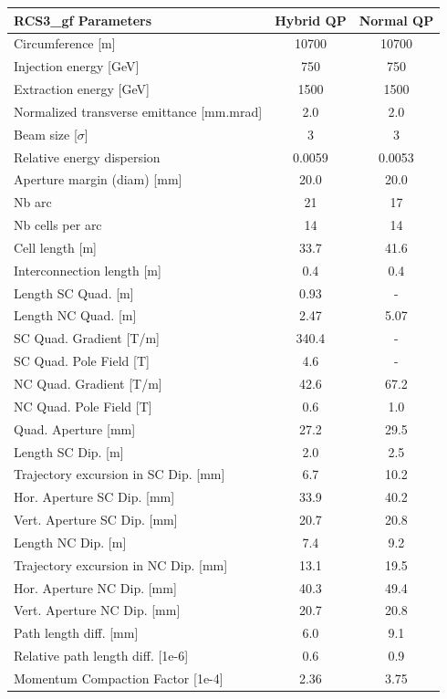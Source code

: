 \begin{tabular}{lcc}
\toprule
RCS3_gf Parameters & Hybrid QP & Normal QP \\
\midrule
Circumference [m] & 10700 & 10700 \\
Injection energy [GeV] & 750 & 750 \\
Extraction energy [GeV] & 1500 & 1500 \\
Normalized transverse emittance [mm.mrad] & 2.0 & 2.0 \\
Beam size [$\sigma$] & 3 & 3 \\
Relative energy dispersion & 0.0059 & 0.0053 \\
Aperture margin (diam) [mm] & 20.0 & 20.0 \\
Nb arc & 21 & 17 \\
Nb cells per arc & 14 & 14 \\
Cell length [m] & 33.7 & 41.6 \\
Interconnection length [m] & 0.4 & 0.4 \\
Length SC Quad. [m] & 0.93 & - \\
Length NC Quad. [m] & 2.47 & 5.07 \\
SC Quad. Gradient [T/m] & 340.4 & - \\
SC Quad. Pole Field [T] & 4.6 & - \\
NC Quad. Gradient [T/m] & 42.6 & 67.2 \\
NC Quad. Pole Field [T] & 0.6 & 1.0 \\
Quad. Aperture [mm] & 27.2 & 29.5 \\
Length SC Dip. [m] & 2.0 & 2.5 \\
Trajectory excursion in SC Dip. [mm] & 6.7 & 10.2 \\
Hor. Aperture SC Dip. [mm] & 33.9 & 40.2 \\
Vert. Aperture SC Dip. [mm] & 20.7 & 20.8 \\
Length NC Dip. [m] & 7.4 & 9.2 \\
Trajectory excursion in NC Dip. [mm] & 13.1 & 19.5 \\
Hor. Aperture NC Dip. [mm] & 40.3 & 49.4 \\
Vert. Aperture NC Dip. [mm] & 20.7 & 20.8 \\
Path length diff. [mm] & 6.0 & 9.1 \\
Relative path length diff. [1e-6] & 0.6 & 0.9 \\
Momentum Compaction Factor [1e-4] & 2.36 & 3.75 \\
\bottomrule
\end{tabular}
